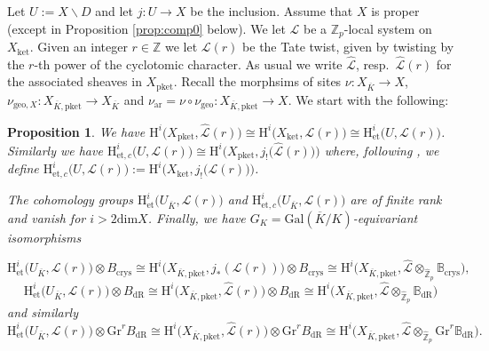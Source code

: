 \documentclass[asterisque,english]{smfart}
\newtheorem{proposition}[theo]{Proposition}
\begin{document}
Let $U:=X\backslash D$ and let $j\colon U\to X$ be the inclusion. Assume that $X$ is proper (except in Proposition \ref{prop:comp0} below).
We let $\mathcal{L}$ be a $\mathbb{Z}_p$-local system on $X_{\mathrm{ket}}$. Given an integer $r\in \mathbb{Z}$ we let $\mathcal{L}(r)$ be the Tate twist, given by twisting by the $r$-th power of the cyclotomic character. As usual we write $\widehat{\mathcal{L}}$, resp.~$\widehat{\mathcal{L}}(r)$ for the associated sheaves in $X_{\mathrm{pket}}$. Recall the morphsims of sites $\nu\colon X_{\overline{K}} \to X$, $\nu_{\mathrm{geo},X}\colon X_{\overline{K},\mathrm{pket}} \to X_{\overline{K}}$ and $\nu_{\mathrm{ar}}=\nu \circ \nu_{\mathrm{geo}} \colon X_{\overline{K},\mathrm{pket}}\to X$. We start with the following:

\begin{proposition}\label{prop:etcoh}
We have $\mathrm{H}^i\bigl(X_{\mathrm{pket}}, \widehat{\mathcal{L}}(r)\bigr)\cong \mathrm{H}^i\bigl(X_{\mathrm{ket}}, \mathcal{L}(r)\bigr)\cong  \mathrm{H}^i_{\mathrm{et}}\bigl(U, \mathcal{L}(r)\bigr)$.  Similarly we have $\mathrm{H}^i_{\mathrm{et},c}\bigl(U, \mathcal{L}(r)\bigr) \cong \mathrm{H}^i\bigl(X_{\mathrm{pket}}, j_!\bigl(\widehat{\mathcal{L}}(r)\bigr)\bigr)$ where, following \cite[Def. 2.3.2]{LLZ}, we define $\mathrm{H}^i_{\mathrm{et},c}\bigl(U, \mathcal{L}(r)\bigr):=\mathrm{H}^i\bigl(X_{\mathrm{ket}}, j_!
\bigl(\mathcal{L}(r)\bigr)\bigr)$. 

The cohomology groups $\mathrm{H}^i_{\mathrm{et}}\bigl(U_{\overline{K}},  \mathcal{L}(r)\bigr)$ and $\mathrm{H}^i_{\mathrm{et},c}\bigl(U_{\overline{K}},  \mathcal{L}(r)\bigr)$ are of finite rank and vanish for $i>2 \mathrm{dim}X$.  Finally, we have  $G_K=\mathrm{Gal}(\overline{K}/K)$-equivariant isomorphisms  

$$\mathrm{H}^i_{\mathrm{et}}\bigl(U_{\overline{K}},  \mathcal{L}(r)\bigr)\otimes  B_{\mathrm{crys}}\cong \mathrm{H}^i\bigl(X_{\overline{K},\mathrm{pket}},  j_\ast(\mathcal{L}(r))\bigr)\otimes B_{\mathrm{crys}}  \cong \mathrm{H}^i\bigl(X_{\overline{K},\mathrm{pket}},\widehat{\mathcal{L}}\otimes_{\widehat{\mathbb{Z}}_p} \mathbb{B}_{\mathrm{crys}}\bigr),$$ $$\mathrm{H}^i_{\mathrm{et}}\bigl(U_{\overline{K}},  \mathcal{L}(r)\bigr)\otimes  B_{\mathrm{dR}}\cong \mathrm{H}^i\bigl(X_{\overline{K},\mathrm{pket}},  \widehat{\mathcal{L}}(r)\bigr)\otimes  B_{\mathrm{dR}} \cong  \mathrm{H}^i\bigl(X_{\overline{K},\mathrm{pket}},\widehat{\mathcal{L}}\otimes_{\widehat{\mathbb{Z}}_p} \mathbb{B}_{\mathrm{dR}}\bigr)$$and similarly $$\mathrm{H}^i_{\mathrm{et}}\bigl(U_{\overline{K}},  \mathcal{L}(r)\bigr)\otimes \mathrm{Gr}^r B_{\mathrm{dR}}\cong \mathrm{H}^i\bigl(X_{\overline{K},\mathrm{pket}},  \widehat{\mathcal{L}}(r)\bigr)\otimes  \mathrm{Gr}^r B_{\mathrm{dR}} \cong  \mathrm{H}^i\bigl(X_{\overline{K},\mathrm{pket}},\widehat{\mathcal{L}}\otimes_{\widehat{\mathbb{Z}}_p} \mathrm{Gr}^r \mathbb{B}_{\mathrm{dR}}\bigr).$$

\end{proposition}
\end{document}
